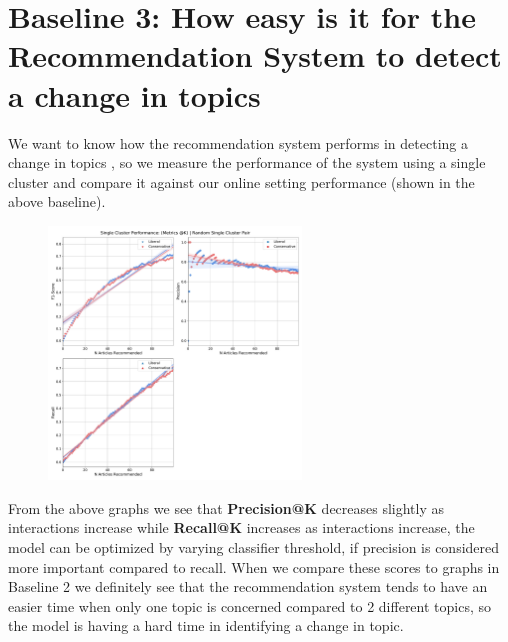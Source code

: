 \documentclass[a4paper,fontsize=9.0pt]{scrartcl}
\begin{document}
\vspace{-1ex}
\section{Baseline 3: How easy is it for the Recommendation System to detect a change in topics}
\begin{flushleft}
We want to know how the recommendation system performs in detecting a change in topics , so we measure the performance of the system using a single cluster and compare it against our online setting performance (shown in the above baseline). 
\end{flushleft}
\begin{figure}[H]
 \includegraphics[width=0.6\textwidth]{Graphs/user_interaction_vs_model_performance_single_cluster.pdf}
\end{figure}
\begin{flushleft}
From the above graphs we see that \textbf{Precision@K} decreases slightly as interactions increase while \textbf{Recall@K} increases as interactions increase, the model can be optimized by varying classifier threshold, if precision is considered more important compared to recall. When we compare these scores to graphs in Baseline 2 we definitely see that the recommendation system tends to have an easier time when only one topic is concerned compared to 2 different topics, so the model is having a hard time in identifying a change in topic.
\end{flushleft}



\vspace{-1ex}
\end{document}
